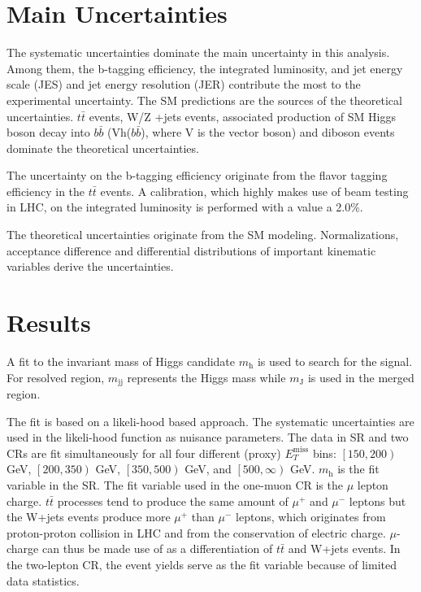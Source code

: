 \documentclass[class=NCU_thesis, crop=false]{standalone}
\begin{document}
\section{Main Uncertainties}
	The systematic uncertainties dominate the main uncertainty in this analysis. Among them, the b-tagging efficiency, the integrated luminosity, and jet energy scale (JES) and jet energy resolution (JER) contribute the most to the experimental uncertainty. The SM predictions are the sources of the theoretical uncertainties. $t\bar{t}$ events, W/Z +jets events, associated production of SM Higgs boson decay into $b\bar{b}$ (Vh($b\bar{b}$), where V is the vector boson) and diboson events dominate the theoretical uncertainties.
	
	The uncertainty on the b-tagging efficiency originate from the flavor tagging efficiency in the $t\bar{t}$ events. A calibration, which highly makes use of beam testing in LHC, on the integrated luminosity is performed with a value a 2.0\%.
	
	The theoretical uncertainties originate from the SM modeling. Normalizations, acceptance difference and differential distributions of important kinematic variables derive the uncertainties.
	
\section{Results}
	A fit to the invariant mass of Higgs candidate $m_{\mathrm{h}}$ is used to search for the signal. For resolved region, $m_{\mathrm{jj}}$ represents the Higgs mass while $m_{\mathrm{J}}$ is used in the merged region.
	
	The fit is based on a likeli-hood based approach. The systematic uncertainties are used in the likeli-hood function as nuisance parameters. The data in SR and two CRs are fit simultaneously for all four different (proxy) $E_T^{\mathrm{miss}}$ bins: $\left[150, 200\right)$ GeV, $\left[200, 350\right)$ GeV, $\left[350, 500\right)$ GeV, and $\left[500, \infty \right)$ GeV. $m_{\mathrm{h}}$ is the fit variable in the SR. The fit variable used in the one-muon CR is the $\mu$ lepton charge. $t\bar{t}$ processes tend to produce the same amount of $\mu^+$ and $\mu^-$ leptons but the W+jets events produce more $\mu^+$ than $\mu^-$ leptons, which originates from proton-proton collision in LHC and from the conservation of electric charge. $\mu$-charge can thus be made use of as a differentiation of $t\bar{t}$ and W+jets events. In the two-lepton CR, the event yields serve as the fit variable because of limited data statistics.
	
\end{document}
